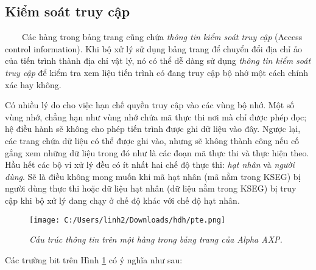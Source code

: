 \documentclass{article}
\begin{document}
\subsection{Kiểm soát truy cập}

~~~~Các hàng trong bảng trang cũng chứa \textit{thông tin kiểm soát truy cập} (Access control information). Khi bộ xử lý sử dụng bảng trang để chuyển đổi địa chỉ ảo của tiến trình thành địa chỉ vật lý, nó có thể dễ dàng sử dụng \textit{thông tin kiểm soát truy cập} để kiểm tra xem liệu tiến trình có đang truy cập bộ nhớ một cách chính xác hay không.\vspace{1em}

Có nhiều lý do cho việc hạn chế quyền truy cập vào các vùng bộ nhớ. Một số vùng nhớ, chẳng hạn như vùng nhớ chứa mã thực thi nơi mà chỉ được phép đọc; hệ điều hành sẽ không cho phép tiến trình được ghi dữ liệu vào đây. Ngược lại, các trang chứa dữ liệu có thể được ghi vào, nhưng sẽ không thành công nếu cố gắng xem những dữ liệu trong đó như là các đoạn mã thực thi và thực hiện theo. Hầu hết các bộ vi xử lý đều có ít nhất hai chế độ thực thi: \textit{hạt nhân} và \textit{người dùng}. Sẽ là điều không mong muốn khi mã hạt nhân (mã nằm trong KSEG) bị người dùng thực thi hoặc dữ liệu hạt nhân (dữ liệu nằm trong KSEG) bị truy cập khi bộ xử lý đang chạy ở chế độ khác với chế độ hạt nhân.
\begin{figure}[H]
  \centering
  \texttt{[image: C:/Users/linh2/Downloads/hdh/pte.png]}
  \caption{\textit{Cấu trúc thông tin trên một hàng trong bảng trang của Alpha AXP.}}
  \label{fig:abstractmodel2}
\end{figure}

Các trường bit trên Hình \ref{fig:abstractmodel2} có ý nghĩa như sau:
\end{document}
